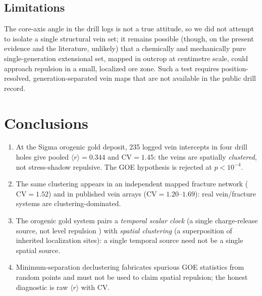 \documentclass[11pt]{article}
\begin{document}
\subsection{Limitations}
The core-axis angle in the drill logs is not a true attitude, so we did not
attempt to isolate a single structural vein set; it remains possible (though, on
the present evidence and the literature, unlikely) that a chemically and
mechanically pure single-generation extensional set, mapped in outcrop at
centimetre scale, could approach repulsion in a small, localized ore zone. Such
a test requires position-resolved, generation-separated vein maps that are not
available in the public drill record.

\section{Conclusions}
\begin{enumerate}
\item At the Sigma orogenic gold deposit, 235 logged vein intercepts in four
drill holes give pooled $\langle r\rangle=0.344$ and $\mathrm{CV}=1.45$: the
veins are spatially \emph{clustered}, not stress-shadow repulsive. The GOE
hypothesis is rejected at $p<10^{-4}$.
\item The same clustering appears in an independent mapped fracture network
($\mathrm{CV}=1.52$) and in published vein arrays ($\mathrm{CV}=1.20$--$1.69$):
real vein/fracture systems are clustering-dominated.
\item The orogenic gold system pairs a \emph{temporal scalar clock} (a single
charge-release source, not level repulsion \citep{chen2026audit}) with
\emph{spatial clustering} (a superposition of inherited localization sites): a
single temporal source need not be a single spatial source.
\item Minimum-separation declustering fabricates spurious GOE statistics from
random points and must not be used to claim spatial repulsion; the honest
diagnostic is raw $\langle r\rangle$ with CV.
\end{enumerate}
\end{document}
